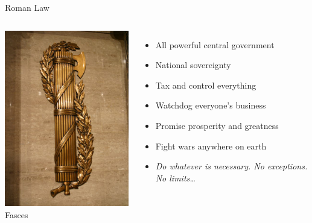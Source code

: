 \begin{frame}{Roman Law}
    \begin{columns}[onlytextwidth]
            \centering
            \includegraphics[height=0.55\textheight]{img/fasces.png} \\
            Fasces \\

            \begin{itemize}
                \item All powerful central government
                \item National sovereignty
                \item Tax and control everything
                \item Watchdog everyone's business
                \item Promise prosperity and greatness
                \item Fight wars anywhere on earth
                \pause
                \item \emph{Do whatever is necessary. No exceptions. No limits\ldots}
            \end{itemize}
    \end{columns}
\end{frame}

